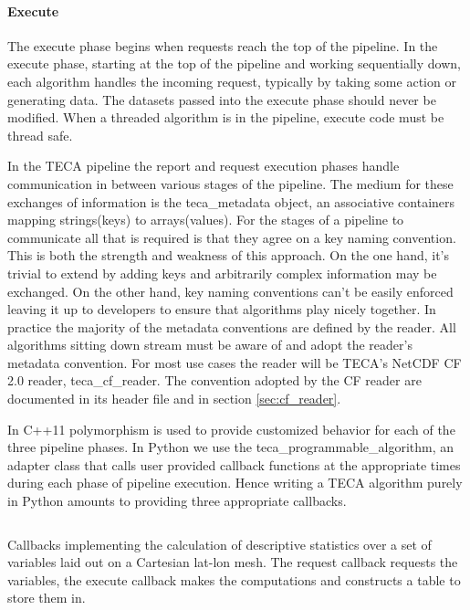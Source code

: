 \documentclass[a4paper,10pt,DIV=12]{scrreprt}
\begin{document}
\paragraph{Execute} The execute phase begins when requests reach the top of the pipeline. In the execute phase, starting at the top of the pipeline and working sequentially down, each algorithm handles the incoming request, typically by taking some action or generating data. The datasets passed into the execute phase should never be modified. When a threaded algorithm is in the pipeline, execute code must be thread safe.

In the TECA pipeline the report and request execution phases handle communication in between various stages of the pipeline. The medium for these exchanges of information is the teca\_metadata object, an associative containers mapping strings(keys) to arrays(values). For the stages of a pipeline to communicate all that is required is that they agree on a key naming convention. This is both the strength and weakness of this approach. On the one hand, it's trivial to extend by adding keys and arbitrarily complex information may be exchanged. On the other hand, key naming conventions can't be easily enforced leaving it up to developers to ensure that algorithms play nicely together. In practice the majority of the metadata conventions are defined by the reader. All algorithms sitting down stream must be aware of and adopt the reader's metadata convention. For most use cases the reader will be TECA's NetCDF CF 2.0 reader, teca\_cf\_reader. The convention adopted by the CF reader are documented in its header file and in section \ref{sec:cf_reader}.

\noindent In C++11 polymorphism is used to provide customized behavior for each of the three pipeline phases. In Python we use the teca\_programmable\_algorithm, an adapter class that calls user provided callback functions at the appropriate times during each phase of pipeline execution. Hence writing a TECA algorithm purely in Python amounts to providing three appropriate callbacks.

\begin{listing}[t]
\begin{center}
\vspace{1mm}
\begin{minipage}{0.8\textwidth}
\inputminted[bgcolor=White, fontsize=\footnotesize, linenos]{python}{source/stats_callbacks.py}
\caption{\small Callbacks implementing the calculation of descriptive statistics over a set of variables laid out on a Cartesian lat-lon mesh. The request callback requests the variables, the execute callback makes the computations and constructs a table to store them in.}
\label{code:py_devel}
\end{minipage}
\end{center}
\end{listing}
\end{document}
